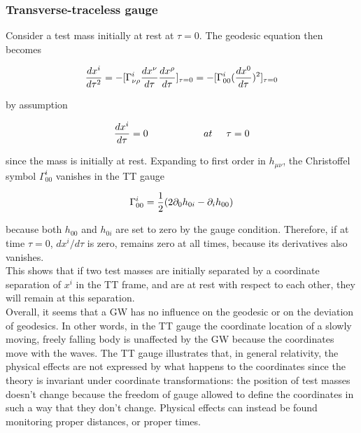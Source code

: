 \documentclass[binding=0.6cm, LaM]{sapthesis}
\begin{document}
\subsubsection{Transverse-traceless gauge}

	Consider a test mass initially at rest at $\tau = 0$. The geodesic equation then becomes

		\begin{equation}
		{{dx^i}\over{d\tau^2}} = -[\Gamma^i_{\nu\rho}{{dx^{\nu}}\over{d\tau}}{{dx^{\rho}}\over{d\tau}}]_{\tau=0} \\ 
		= - [ \Gamma^i_{00}({{dx^0}\over{d\tau}})^2]_{\tau=0}
		\end{equation}

	by assumption
		
		\begin{equation}
		{{dx^i}\over{d\tau}} = 0 \hspace*{2cm} at \hspace*{0.5cm}\tau = 0
		\end{equation}

	since the mass is initially at rest. Expanding to first order in $h_{\mu\nu}$, 
	the Christoffel symbol $\Gamma^i_{00}$ vanishes in the TT gauge

		\begin{equation}
		\Gamma^i_{00} = {1 \over {2}}(2\partial_{0}h_{0i} - \partial_i h_{00})
		\end{equation}

	because both $h_{00}$ and $h_{0i}$ are set to zero by the gauge condition. 
	Therefore, if at time $\tau = 0$, $dx^i/d\tau$ is zero, remains zero at all times, 
	because its derivatives also vanishes. \\
	This shows that if two test masses are initially separated by a coordinate separation of $x^i$ in the TT frame, 
	and are at rest with respect to each other, they will remain at this separation. \\
	Overall, it seems that a GW has no influence on the geodesic or on the deviation of geodesics.
	In other words, in the TT gauge the coordinate location of a slowly moving, freely falling body is unaffected 
	by the GW because the coordinates move with the waves.
	The TT gauge illustrates that, in general relativity, the physical effects are not expressed by what happens 
	to the coordinates since the theory is invariant under coordinate transformations:
	the position of test masses doesn't change because the freedom of gauge allowed to define the coordinates 
	in such a way that they don't change.
	Physical effects can instead be found monitoring proper distances, or proper times.
\end{document}
